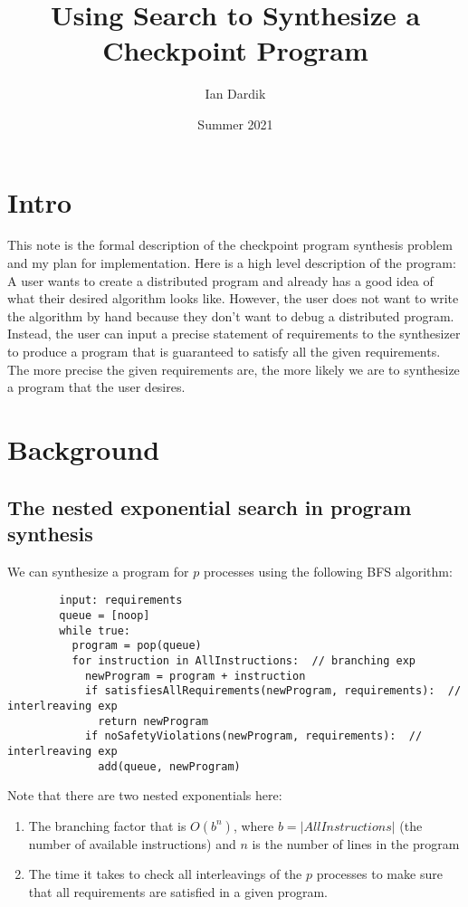 \documentclass[12pt]{article}
\title{Using Search to Synthesize a Checkpoint Program}
\date{Summer 2021}
\author{Ian Dardik}
\begin{document}
\maketitle

\section{Intro}
This note is the formal description of the checkpoint program synthesis problem and my plan for implementation.  Here is a high level description of the program: \\

A user wants to create a distributed program and already has a good idea of what their desired algorithm looks like.  However, the user does not want to write the algorithm by hand because they don't want to debug a distributed program.  Instead, the user can input a precise statement of requirements to the synthesizer to produce a program that is guaranteed to satisfy all the given requirements.  The more precise the given requirements are, the more likely we are to synthesize a program that the user desires.  

\section{Background}
\subsection{The nested exponential search in program synthesis}
	We can synthesize a program for $p$ processes using the following BFS algorithm:
	\begin{verbatim}
		input: requirements
		queue = [noop]
		while true:
		  program = pop(queue)
		  for instruction in AllInstructions:  // branching exp
		    newProgram = program + instruction
		    if satisfiesAllRequirements(newProgram, requirements):  // interlreaving exp
		      return newProgram
		    if noSafetyViolations(newProgram, requirements):  // interlreaving exp
		      add(queue, newProgram)
	\end{verbatim}

	Note that there are two nested exponentials here:
	\begin{enumerate}
		\item The branching factor that is $O(b^n)$, where $b=|AllInstructions|$ (the number of available instructions) and $n$ is the number of lines in the program
		\item The time it takes to check all interleavings of the $p$ processes to make sure that all requirements are satisfied in a given program.  
	\end{enumerate}
\end{document}
